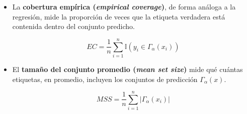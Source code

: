 \begin{itemize}
    



    \item La \textbf{cobertura empírica (\textit{empirical coverage})}, de forma análoga a la regresión, 
    mide la proporción de veces que la etiqueta verdadera está contenida dentro del conjunto predicho.

    $$
    EC = \frac{1}{n} \sum_{i=1}^{n} \mathbb{I}(y_i \in \Gamma_\alpha(x_i))
    $$

    \item El \textbf{tamaño del conjunto promedio (\textit{mean set size})} mide qué cuántas etiquetas,
    en promedio, incluyen los conjuntos de predicción $\Gamma_\alpha(x)$.

    $$
    MSS = \frac{1}{n} \sum_{i=1}^n | \Gamma_\alpha(x_i) |
    $$

\end{itemize}


